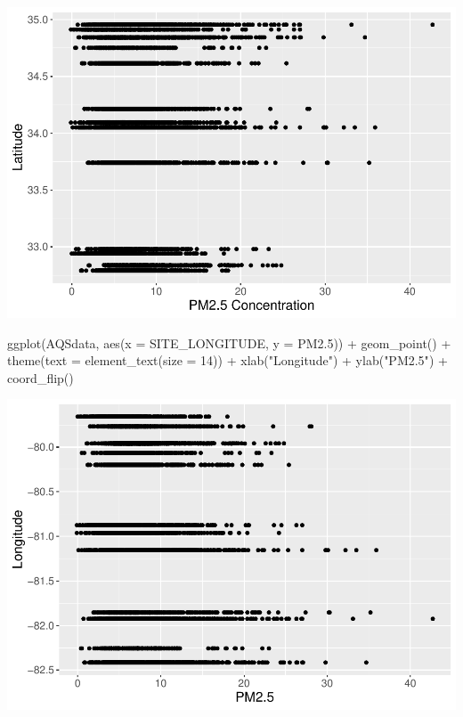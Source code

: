 \documentclass[
]{article}
\newenvironment{Shaded}{\begin{snugshade}}{\end{snugshade}}
\newcommand{\AttributeTok}[1]{\textcolor[rgb]{0.77,0.63,0.00}{#1}}
\newcommand{\DecValTok}[1]{\textcolor[rgb]{0.00,0.00,0.81}{#1}}
\newcommand{\FloatTok}[1]{\textcolor[rgb]{0.00,0.00,0.81}{#1}}
\newcommand{\FunctionTok}[1]{\textcolor[rgb]{0.00,0.00,0.00}{#1}}
\newcommand{\NormalTok}[1]{#1}
\newcommand{\SpecialCharTok}[1]{\textcolor[rgb]{0.00,0.00,0.00}{#1}}
\newcommand{\StringTok}[1]{\textcolor[rgb]{0.31,0.60,0.02}{#1}}
\begin{document}
\includegraphics{HW1-Trinath-Sai-Subhash-Reddy-Pittala_files/figure-latex/unnamed-chunk-31-1.pdf}

\begin{Shaded}
\begin{Highlighting}[]
\FunctionTok{ggplot}\NormalTok{(AQSdata, }\FunctionTok{aes}\NormalTok{(}\AttributeTok{x =}\NormalTok{ SITE\_LONGITUDE, }\AttributeTok{y =}\NormalTok{ PM2}\FloatTok{.5}\NormalTok{)) }\SpecialCharTok{+} \FunctionTok{geom\_point}\NormalTok{() }\SpecialCharTok{+}
    \FunctionTok{theme}\NormalTok{(}\AttributeTok{text =} \FunctionTok{element\_text}\NormalTok{(}\AttributeTok{size =} \DecValTok{14}\NormalTok{)) }\SpecialCharTok{+} \FunctionTok{xlab}\NormalTok{(}\StringTok{"Longitude"}\NormalTok{) }\SpecialCharTok{+}
    \FunctionTok{ylab}\NormalTok{(}\StringTok{"PM2.5"}\NormalTok{) }\SpecialCharTok{+} \FunctionTok{coord\_flip}\NormalTok{()}
\end{Highlighting}
\end{Shaded}

\includegraphics{HW1-Trinath-Sai-Subhash-Reddy-Pittala_files/figure-latex/unnamed-chunk-31-2.pdf}
\end{document}
